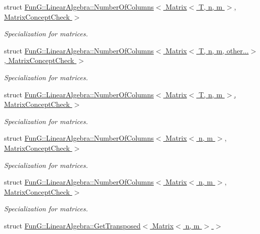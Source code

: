 \begin{DoxyCompactItemize}
struct \hyperlink{structFunG_1_1LinearAlgebra_1_1NumberOfColumns_3_01Matrix_3_01T_00_01n_00_01m_01_4_00_01MatrixConceptCheck_01_4}{\-Fun\-G\-::\-Linear\-Algebra\-::\-Number\-Of\-Columns$<$ Matrix$<$ T, n, m $>$, Matrix\-Concept\-Check $>$}
\begin{DoxyCompactList}\small\item\em \-Specialization for matrices. \end{DoxyCompactList}\item 
struct \hyperlink{structFunG_1_1LinearAlgebra_1_1NumberOfColumns_3_01Matrix_3_01T_00_01n_00_01m_00_01other_8_8_8_4_00_01MatrixConceptCheck_01_4}{\-Fun\-G\-::\-Linear\-Algebra\-::\-Number\-Of\-Columns$<$ Matrix$<$ T, n, m, other...$>$, Matrix\-Concept\-Check $>$}
\begin{DoxyCompactList}\small\item\em \-Specialization for matrices. \end{DoxyCompactList}\item 
struct \hyperlink{structFunG_1_1LinearAlgebra_1_1NumberOfColumns_3_01Matrix_3_01T_00_01n_00_01m_01_4_00_01MatrixConceptCheck_01_4}{\-Fun\-G\-::\-Linear\-Algebra\-::\-Number\-Of\-Columns$<$ Matrix$<$ T, n, m $>$, Matrix\-Concept\-Check $>$}
\begin{DoxyCompactList}\small\item\em \-Specialization for matrices. \end{DoxyCompactList}\item 
struct \hyperlink{structFunG_1_1LinearAlgebra_1_1NumberOfColumns_3_01Matrix_3_01n_00_01m_01_4_00_01MatrixConceptCheck_01_4}{\-Fun\-G\-::\-Linear\-Algebra\-::\-Number\-Of\-Columns$<$ Matrix$<$ n, m $>$, Matrix\-Concept\-Check $>$}
\begin{DoxyCompactList}\small\item\em \-Specialization for matrices. \end{DoxyCompactList}\item 
struct \hyperlink{structFunG_1_1LinearAlgebra_1_1NumberOfColumns_3_01Matrix_3_01n_00_01m_01_4_00_01MatrixConceptCheck_01_4}{\-Fun\-G\-::\-Linear\-Algebra\-::\-Number\-Of\-Columns$<$ Matrix$<$ n, m $>$, Matrix\-Concept\-Check $>$}
\begin{DoxyCompactList}\small\item\em \-Specialization for matrices. \end{DoxyCompactList}\item 
struct \hyperlink{structFunG_1_1LinearAlgebra_1_1GetTransposed_3_01Matrix_3_01n_00_01m_01_4_01_4}{\-Fun\-G\-::\-Linear\-Algebra\-::\-Get\-Transposed$<$ Matrix$<$ n, m $>$ $>$}

\end{DoxyCompactItemize}
